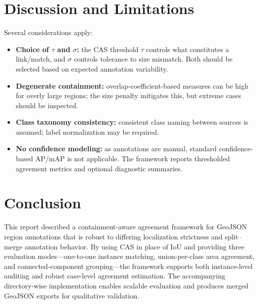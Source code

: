 \documentclass[11pt]{article}
\begin{document}
\section{Discussion and Limitations}
Several considerations apply:
\begin{itemize}[leftmargin=*]
  \item \textbf{Choice of $\tau$ and $\sigma$:} the CAS threshold $\tau$ controls what constitutes a link/match, and $\sigma$ controls tolerance to size mismatch. Both should be selected based on expected annotation variability.
  \item \textbf{Degenerate containment:} overlap-coefficient-based measures can be high for overly large regions; the size penalty mitigates this, but extreme cases should be inspected.
  \item \textbf{Class taxonomy consistency:} consistent class naming between sources is assumed; label normalization may be required.
  \item \textbf{No confidence modeling:} as annotations are manual, standard confidence-based AP/mAP is not applicable. The framework reports thresholded agreement metrics and optional diagnostic summaries.
\end{itemize}

\section{Conclusion}
This report described a containment-aware agreement framework for GeoJSON region annotations that is robust to differing localization strictness and split--merge annotation behavior.
By using CAS in place of IoU and providing three evaluation modes---one-to-one instance matching, union-per-class area agreement, and connected-component grouping---the framework supports both instance-level auditing and robust case-level agreement estimation.
The accompanying directory-wise implementation enables scalable evaluation and produces merged GeoJSON exports for qualitative validation.
\end{document}

